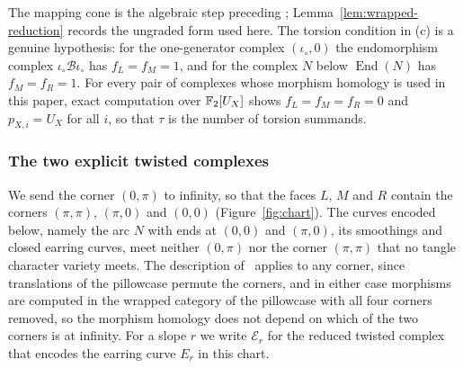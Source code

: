 \begin{remark}\label{rem:kwz-cone}
The mapping cone is the algebraic step preceding \cite[Thm.~5.22]{KWZ};
Lemma~\ref{lem:wrapped-reduction} records the ungraded form used here.  The torsion condition
in (c) is a genuine hypothesis: for the one-generator complex $(\iota_\circ,0)$ the endomorphism
complex $\iota_\circ\mathcal B\iota_\circ$ has $f_L=f_M=1$, and for the complex $N$ below
$\operatorname{End}(N)$ has $f_M=f_R=1$.  For every pair of complexes whose morphism homology is used
in this paper, exact computation over $\mathbb{F}_2[U_X]$ shows $f_L=f_M=f_R=0$ and $p_{X,i}=U_X$ for all
$i$, so that $\tau$ is the number of torsion summands.
\end{remark}

\subsubsection{The two explicit twisted complexes}\label{ss:explicit}
We send the corner $(0,\pi)$ to infinity, so that the faces $L$, $M$ and $R$ contain the corners
$(\pi,\pi)$, $(\pi,0)$ and $(0,0)$ (Figure~\ref{fig:chart}).  The curves encoded below, namely the arc $N$ with ends at
$(0,0)$ and $(\pi,0)$, its smoothings and closed earring curves, meet neither $(0,\pi)$ nor the corner
$(\pi,\pi)$ that no tangle character variety meets.  The description of~\cite[\S11.5]{CHKK} applies to any
corner, since
translations of the pillowcase permute the corners, and in either case morphisms are computed in the
wrapped category of the pillowcase with all four corners removed, so the morphism homology does not
depend on which of the two corners is at infinity.  For a slope $r$ we write $\mathcal E_r$ for the reduced
twisted complex that encodes the earring curve $E_r$ in this chart.

